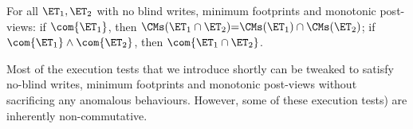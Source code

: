 
\begin{theorem}[Compositionality]     
For all $\ET_1, \ET_2$ with no blind writes, minimum footprints and monotonic post-views: 
if $\com{\ET_1}$, 
then $\CMs(\ET_1 \cap \ET_2) {=} \CMs(\ET_1) \cap \CMs(\ET_2)$;
if $\com{\ET_1} \land \com{\ET_2}$, then $\com{\ET_1 \cap \ET_2}$.
\end{theorem}

Most of the execution tests that we introduce shortly 
can be tweaked to satisfy no-blind writes, minimum footprints and monotonic post-views 
without sacrificing any anomalous behaviours. However, some of these execution tests) 
are inherently non-commutative.


